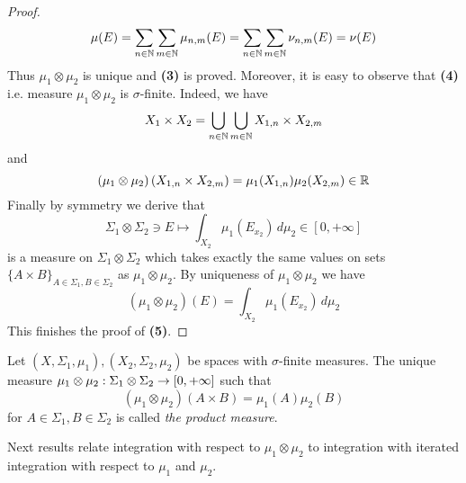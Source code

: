 \begin{proof}
$$\mu(E) = \sum_{n\in {\mathbb N}}\sum_{m\in {\mathbb N}}\mu_{n,m}(E) = \sum_{n\in {\mathbb N}}\sum_{m\in {\mathbb N}}\nu_{n,m}(E) = \nu(E)$$
Thus $\mu_1\otimes \mu_2$ is unique and \textbf{(3)} is proved. Moreover, it is easy to observe that \textbf{(4)} i.e. measure $\mu_1\otimes \mu_2$ is $\sigma$-finite. Indeed, we have
$$X_1\times X_2 = \bigcup_{n\in {\mathbb N}}\bigcup_{m\in {\mathbb N}}X_{1,n}\times X_{2,m}$$
and
$$\left(\mu_1\otimes \mu_2\right)\left(X_{1,n}\times X_{2,m}\right) = \mu_1(X_{1,n})\mu_2(X_{2,m}) \in {\mathbb R}$$
Finally by symmetry we derive that
$$\Sigma_1\otimes \Sigma_2\ni E \mapsto \int_{X_2}\mu_1(E_{x_2})\,d\mu_2\in [0,+\infty]$$
is a measure on $\Sigma_1\otimes \Sigma_2$ which takes exactly the same values on sets $\big\{A\times B\big\}_{A\in \Sigma_1,B\in \Sigma_2}$ as $\mu_1\otimes \mu_2$. By uniqueness of $\mu_1\otimes \mu_2$ we have
$$(\mu_1\otimes \mu_2)(E) = \int_{X_2}\mu_1(E_{x_2})\,d\mu_2$$
This finishes the proof of \textbf{(5)}.
\end{proof}

\begin{definition}
Let $(X,\Sigma_1,\mu_1), (X_2,\Sigma_2,\mu_2)$ be spaces with $\sigma$-finite measures. The unique measure $\mu_1\otimes \mu_2:\Sigma_1\otimes \Sigma_2\rightarrow [0,+\infty]$ such that
$$\left(\mu_1\otimes \mu_2\right)\left(A\times B\right) = \mu_1(A)\mu_2(B)$$
for $A\in \Sigma_1, B\in \Sigma_2$ is called \textit{the product measure}.
\end{definition}
\noindent
Next results relate integration with respect to $\mu_1\otimes \mu_2$ to integration with iterated integration with respect to $\mu_1$ and $\mu_2$.

